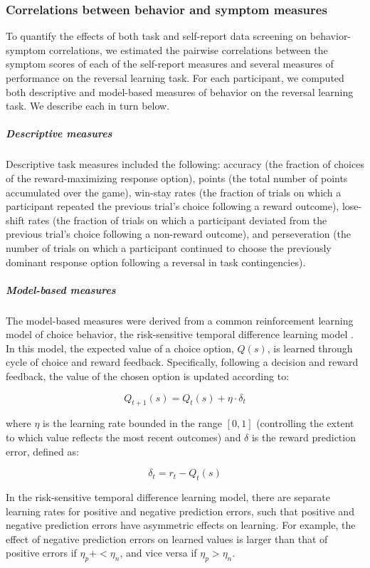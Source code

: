 \documentclass[a4paper,notitlepage,12pt]{article}
\begin{document}
\begin{refsection}[main]
\subsubsection{Correlations between behavior and symptom measures}

To quantify the effects of both task and self-report data screening on behavior-symptom correlations, we estimated the pairwise correlations between the symptom scores of each of the self-report measures and several measures of performance on the reversal learning task. For each participant, we computed both descriptive and model-based measures of behavior on the reversal learning task. We describe each in turn below.

\subparagraph{Descriptive measures} Descriptive task measures included the following: accuracy (the fraction of choices of the reward-maximizing response option), points (the total number of points accumulated over the game), win-stay rates (the fraction of trials on which a participant repeated the previous trial's choice following a reward outcome), lose-shift rates (the fraction of trials on which a participant deviated from the previous trial's choice following a non-reward outcome), and perseveration (the number of trials on which a participant continued to choose the previously dominant response option following a reversal in task contingencies).

\subparagraph{Model-based measures} The model-based measures were derived from a common reinforcement learning model of choice behavior, the risk-sensitive temporal difference learning model \cite{niv2012neural}. In this model, the expected value of a choice option, $Q(s)$, is learned through cycle of choice and reward feedback. Specifically, following a decision and reward feedback, the value of the chosen option is updated according to:

\begin{equation*}
    Q_{t+1}(s) = Q_{t}(s) + \eta \cdot \delta_{t}
\end{equation*}

where $\eta$ is the learning rate bounded in the range $[0,1]$ (controlling the extent to which value reflects the most recent outcomes) and $\delta$ is the reward prediction error, defined as:

\begin{equation*}
    \delta_t = r_t - Q_{t}(s)
\end{equation*}

In the risk-sensitive temporal difference learning model, there are separate learning rates for positive and negative prediction errors, such that positive and negative prediction errors have asymmetric effects on learning. For example, the effect of negative prediction errors on learned values is larger than that of positive errors if $\eta_p+ < \eta_n$, and vice versa if $\eta_p > \eta_n$.


\end{refsection}
\end{document}

